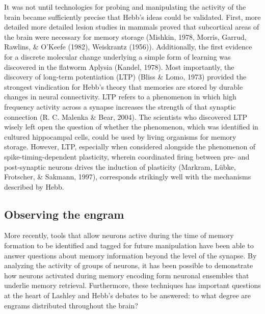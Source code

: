 \documentclass[12pt,a4paper,]{report}
\begin{document}
It was not until technologies for probing and manipulating the activity
of the brain became sufficiently precise that Hebb's ideas could be
validated. First, more detailed more detailed lesion studies in mammals
proved that subcortical areas of the brain were necessary for memory
storage (Mishkin, 1978, Morris, Garrud, Rawlins, \& O'Keefe (1982),
Weiskrantz (1956)). Additionally, the first evidence for a discrete
molecular change underlying a simple form of learning was discovered in
the flatworm Aplysia (Kandel, 1978). Most importantly, the discovery of
long-term potentiation (LTP) (Bliss \& Lomo, 1973) provided the
strongest vindication for Hebb's theory that memories are stored by
durable changes in neural connectivity. LTP refers to a phenomenon in
which high frequency activity across a synapse increases the strength of
that synaptic connection (R. C. Malenka \& Bear, 2004). The scientists
who discovered LTP wisely left open the question of whether the
phenomenon, which was identified in cultured hippocampal cells, could be
used by living organisms for memory storage. However, LTP, especially
when considered alongside the phenomenon of spike-timing-dependent
plasticity, wherein coordinated firing between pre- and post-synaptic
neurons drives the induction of plasticity (Markram, Lübke, Frotscher,
\& Sakmann, 1997), corresponds strikingly well with the mechanisms
described by Hebb.

\subsection{Observing the engram}\label{observing-the-engram}

More recently, tools that allow neurons active during the time of memory
formation to be identified and tagged for future manipulation have been
able to answer questions about memory information beyond the level of
the synapse. By analyzing the activity of groups of neurons, it has been
possible to demonstrate how neurons activated during memory encoding
form neuronal ensembles that underlie memory retrieval. Furthermore,
these techniques has important questions at the heart of Lashley and
Hebb's debates to be answered: to what degree are engrams distributed
throughout the brain?
\end{document}

